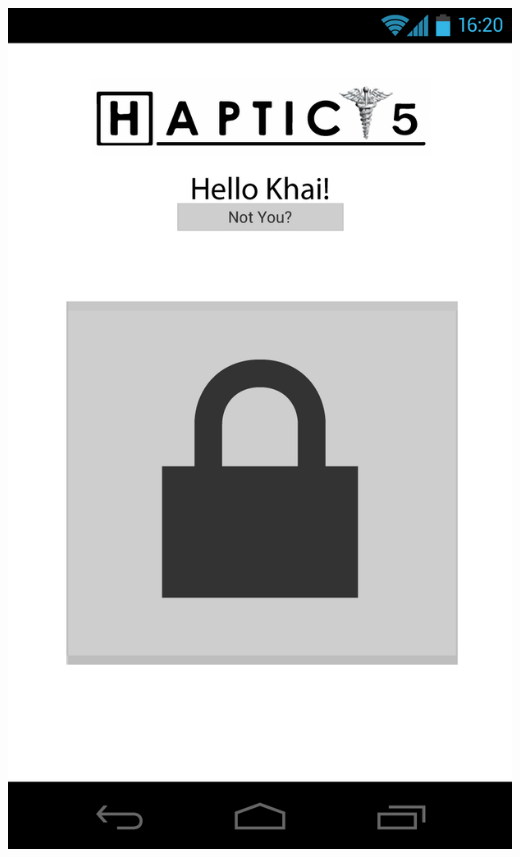 \documentclass[pdftex,12pt,a4paper]{report}
\begin{document}
\includegraphics[scale=0.18]{Screens/00-Lock.png}
\end{document}
